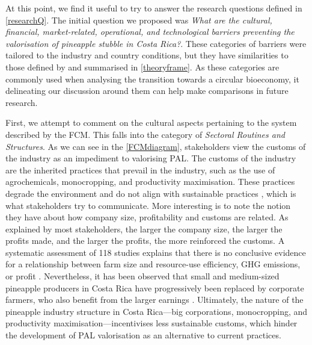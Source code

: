 At this point, we find it useful to try to answer the research questions defined in \cref{researchQ}. The initial question we proposed was
\textit{What are the cultural, financial, market-related, operational, and technological barriers preventing the valorisation of pineapple stubble in Costa Rica?}. These categories of barriers were tailored to the industry and country conditions, but they have similarities to those defined by \cite{gottinger2020studying} and summarised in \cref{theoryframe}. As these categories are commonly used when analysing the transition towards a circular bioeconomy, it delineating our discussion around them can help make comparisons in future research. 

First, we attempt to comment on the cultural aspects pertaining to the system described by the FCM. This falls into the category of \textit{Sectoral Routines and Structures}. As we can see in the \cref{FCMdiagram}, stakeholders view the customs of the industry as an impediment to valorising PAL. The customs of the industry are the inherited practices that prevail in the industry, such as the use of agrochemicals, monocropping, and productivity maximisation. These practices degrade the environment and do not align with sustainable practices \citep{magdoff2000hungry}, which is what stakeholders try to communicate. More interesting is to note the notion they have about how company size, profitability and customs are related. As explained by most stakeholders, the larger the company size, the larger the profits made, and the larger the profits, the more reinforced the customs. A systematic assessment of 118 studies explains that there is no conclusive evidence for a relationship between farm size and resource-use efficiency, GHG emissions, or profit \citep{ricciardi2021higher}. Nevertheless, it has been observed that small and medium-sized pineapple producers in Costa Rica have progressively been replaced by corporate farmers, who also benefit from the larger earnings \citep{rodriguez2020extractivismo}. Ultimately, the nature of the pineapple industry structure in Costa Rica---big corporations, monocropping, and productivity maximisation---incentivises less sustainable customs, which hinder the development of PAL valorisation as an alternative to current practices. 

